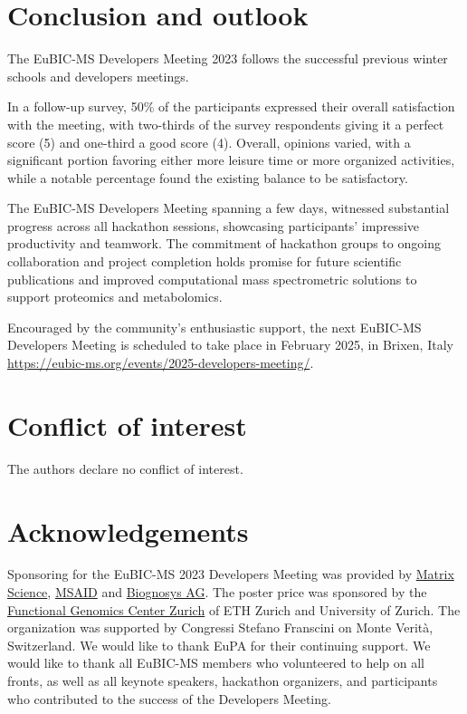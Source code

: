 \section{Conclusion and outlook}
The EuBIC-MS Developers Meeting 2023 follows the successful previous winter schools and developers meetings.

In a follow-up survey, 50\% of the participants expressed their overall satisfaction with the meeting, with two-thirds of the survey respondents giving it a perfect score (5) and one-third a good score (4).
Overall, opinions varied, with a significant portion favoring either more leisure time or more organized activities, while a notable percentage found the existing balance to be satisfactory.
    
The EuBIC-MS Developers Meeting spanning a few days, witnessed substantial progress across all hackathon sessions, showcasing participants' impressive productivity and teamwork. The commitment of hackathon groups to ongoing collaboration and project completion holds promise for future scientific publications and improved computational mass spectrometric solutions to support proteomics and metabolomics.

Encouraged by the community’s enthusiastic support, the next EuBIC-MS Developers Meeting is scheduled to take place in February 2025, in Brixen, Italy \url{https://eubic-ms.org/events/2025-developers-meeting/}.
 
\section{Conflict of interest}
The authors declare no conflict of interest.
 
\section{Acknowledgements}
Sponsoring for the EuBIC-MS 2023 Developers Meeting was provided by \href{https://www.matrixscience.com/}{Matrix Science}, \href{https://www.msaid.de/}{MSAID} and \href{https://biognosys.com/}{Biognosys AG}. The poster price was sponsored by the \href{https://fgcz.ch}{Functional Genomics Center Zurich} of ETH Zurich and University of Zurich. The organization was supported by Congressi Stefano Franscini on Monte Verità, Switzerland. We would like to thank EuPA for their continuing support. We would like to thank all EuBIC-MS members who volunteered to help on all fronts, as well as all keynote speakers, hackathon organizers, and participants who contributed to the success of the Developers Meeting.

